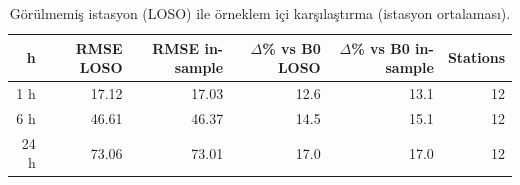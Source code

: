 \begin{table}[t]
\caption{Görülmemiş istasyon (LOSO) ile örneklem içi karşılaştırma (istasyon ortalaması).}
\label{tab:rq1_loso}
\centering\footnotesize
\begin{tabular}{rrrrrr}
\toprule
h & RMSE LOSO & RMSE in-sample & $\Delta$\% vs B0 LOSO & $\Delta$\% vs B0 in-sample & Stations \\
\midrule
1 h & 17.12 & 17.03 & 12.6 & 13.1 & 12 \\
6 h & 46.61 & 46.37 & 14.5 & 15.1 & 12 \\
24 h & 73.06 & 73.01 & 17.0 & 17.0 & 12 \\
\bottomrule
\end{tabular}
\end{table}
